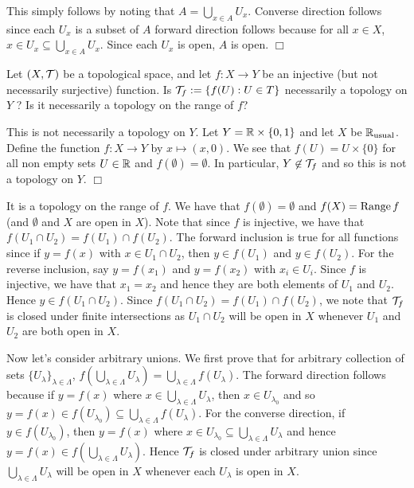 \documentclass{article}
\begin{document}
\begin{spacedenumerate}
    This simply follows by noting that $A = \bigcup_{x\in A} U_{x}$. Converse direction follows since each $U_{x}$ is a subset of $A$ forward direction follows because for all $x\in X$, $x\in U_{x} \subseteq \bigcup_{x\in A} U_{x}$. Since each $U_{x}$ is open, $A$ is open. $\Box$
    \item Let $(X, \mathcal{T} )$ be a topological space, and let $f : X \to Y$ be an injective (but not necessarily surjective) function. Is $\mathcal{T}_{f} := \{ f(U) : U \in T \}$ necessarily a topology on $Y$ ? Is it
    necessarily a topology on the range of $f$?

    This is not necessarily a topology on $Y$. Let $Y = \mathbb{R}\times\{0,1\}$ and let $X$ be $\mathbb{R}_{\text{usual}}$. Define the function $f: X\to Y$ by $x\mapsto (x,0)$. We see that $f(U) = U\times \{0\}$ for all non empty sets $U\in \mathbb{R}$ and $f(\emptyset) = \emptyset$. In particular, $Y\not\in \mathcal{T}_{f}$ and so this is not a topology on $Y$. $\Box$

    It is a topology on the range of $f$. We have that $f(\emptyset) = \emptyset$ and $f(X) = \operatorname{Range} f$ (and $\emptyset$ and $X$ are open in $X$). Note that since $f$ is injective, we have that $f(U_{1}\cap U_{2}) = f(U_{1})\cap f(U_{2})$. The forward inclusion is true for all functions since if $y = f(x)$ with $x\in U_{1}\cap U_{2}$, then $y\in f(U_{1})$ and $y\in f(U_{2})$. For the reverse inclusion, say $y = f(x_{1})$ and $y = f(x_{2})$ with $x_{i}\in U_{i}$. Since $f$ is injective, we have that $x_{1} = x_{2}$ and hence they are both elements of $U_{1}$ and $U_{2}$. Hence $y\in f(U_{1}\cap U_{2})$. Since  $f(U_{1}\cap U_{2}) = f(U_{1})\cap f(U_{2})$, we note that $\mathcal{T}_{f}$ is closed under finite intersections as $U_{1}\cap U_{2}$ will be open in $X$ whenever $U_{1}$ and $U_{2}$ are both open in $X$.

    Now let's consider arbitrary unions. We first prove that for arbitrary collection of sets $\{U_{\lambda}\}_{\lambda\in\Lambda}$, $f\left(\bigcup_{\lambda\in\Lambda}U_{\lambda}\right) = \bigcup_{\lambda\in \Lambda}f(U_{\lambda})$. The forward direction follows because if $y = f(x)$ where $x\in \bigcup_{\lambda\in \Lambda}U_{\lambda}$, then $x\in U_{\lambda_{0}}$ and so $y =f(x)\in f(U_{\lambda_{0}})\subseteq \bigcup_{\lambda\in \Lambda}f(U_{\lambda})$. For the converse direction, if $y \in f(U_{\lambda_{0}})$, then $y = f(x)$ where $x\in U_{\lambda_{0}}\subseteq \bigcup_{\lambda\in \Lambda}U_{\lambda}$ and hence $y= f(x)\in f\left(\bigcup_{\lambda\in\Lambda}U_{\lambda}\right)$. Hence $\mathcal{T}_{f}$ is closed under arbitrary union since $\bigcup_{\lambda\in\Lambda}U_{\lambda}$ will be open in $X$ whenever each $U_{\lambda}$ is open in $X$.
    

\end{spacedenumerate}
\end{document}
